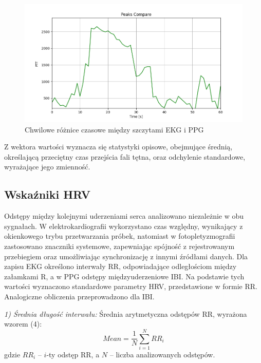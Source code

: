 \documentclass[journal]{IEEEtran}
\begin{document}
{\newpage
\begin{figure}[htbp]
    \centering
    \includegraphics[width=1.0\linewidth]{Peaks_compare.png}
   \caption{Chwilowe różnice czasowe między szczytami EKG i PPG}
    \label{fig:PTT}
\end{figure}

Z wektora wartości wyznacza się statystyki opisowe, obejmujące średnią, określającą przeciętny czas przejścia fali tętna, oraz odchylenie standardowe, wyrażające jego zmienność.

\subsection{Wskaźniki HRV}
Odstępy między kolejnymi uderzeniami serca analizowano niezależnie w obu sygnałach. W elektrokardiografii wykorzystano czas względny, wynikający z okienkowego trybu przetwarzania próbek, natomiast w fotopletyzmografii zastosowano znaczniki systemowe, zapewniając spójność z rejestrowanym przebiegiem oraz umożliwiając synchronizację z innymi źródłami danych. Dla zapisu EKG określono interwały RR, odpowiadające odległościom między załamkami R, a w PPG odstępy międzyuderzeniowe IBI. Na podstawie tych wartości wyznaczono standardowe parametry HRV, przedstawione w formie RR. Analogiczne obliczenia przeprowadzono dla IBI.

\noindent\textit{1) Średnia długość interwału:} 
Średnia arytmetyczna odstępów RR, wyrażona wzorem (4):
\begin{equation}
    Mean = \frac{1}{N} \sum_{i=1}^{N} RR_i
\end{equation}
gdzie $RR_i$ -- $i$-ty odstęp RR, a $N$ – liczba analizowanych odstępów.

}
\end{document}

